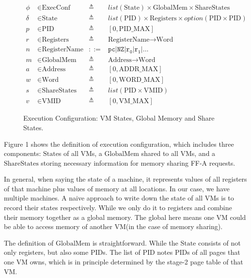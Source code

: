 \documentclass[a4paper]{article}
\newcommand*{\defined}{\triangleq}
\newcommand*{\maps}{\rightarrow}
\newcommand*{\derived}{::=}
\newcommand*{\CONF}{\text{ExecConf}}
\newcommand*{\STATE}{\text{State}}
\newcommand*{\MEM}{\text{GlobalMem}}
\newcommand*{\SSS}{\text{ShareStates}}
\newcommand*{\PID}{\text{PID}}
\newcommand*{\REGS}{\text{Registers}}
\newcommand*{\ADDR}{\text{Address}}
\newcommand*{\WORD}{\text{Word}}
\newcommand*{\VMID}{\text{VMID}}
\newcommand*{\REGNAMES}{\text{RegisterName}}
\newcommand*{\PAMAX}{\text{ADDR\_MAX}}
\newcommand*{\PPIDMAX}{\text{PID\_MAX}}
\newcommand*{\PWMAX}{\text{WORD\_MAX}}
\newcommand*{\PVMMAX}{\text{VM\_MAX}}
\begin{document}
\begin{figure}
  \begin{align*}
    \phi &\in \CONF &\defined &list(\STATE) \times \MEM \times \SSS \\
    \delta &\in \STATE &\defined &list(\PID) \times \REGS \times option(\PID \times \PID) \\
    p & \in \PID &\defined  &[ 0, \PPIDMAX ] \\
    r & \in \REGS &\defined  &\REGNAMES \maps \WORD \\
    n & \in \REGNAMES &\derived  &\mathtt{pc} | \mathtt{NZ} | \mathtt {r_{0}} | \mathtt{r_{1}} | \dots \\
    m & \in \MEM &\defined  &\ADDR \maps \WORD \\
    a & \in \ADDR &\defined  &[ 0, \PAMAX ] \\
    w & \in \WORD &\defined  &[ 0, \PWMAX ] \\
    s & \in \SSS &\defined  &list(\PID \times \VMID) \\
    v & \in \VMID &\defined  &[ 0, \PVMMAX ]
  \end{align*}
  \caption{Execution Configuration: VM States, Global Memory and Share States.}
\end{figure}
Figure 1 shows the definition of execution configuration, which includes three
components: $\STATE$s of all VMs, a $\MEM$ shared to all VMs, and a $\SSS$
storing necessary information for memory sharing FF-A requests.

In general, when saying the state of a machine, it represents values of all
registers of that machine plus values of memory at all locations. In our case,
we have multiple machines. A naive approach to write down the state of all VMs
is to record their states respectively. While we only do it to registers and
combine their memory together as a global memory. The global here means one VM
could be able to access memory of another VM(in the case of memory sharing).

The definition of $\MEM$ is straightforward. While the $\STATE$ consists of not
only registers, but also some $\PID$s. The list of $\PID$ notes $\PID$s of all
pages that one VM owns, which is in principle determined by the stage-2 page
table of that VM.

\end{document}

